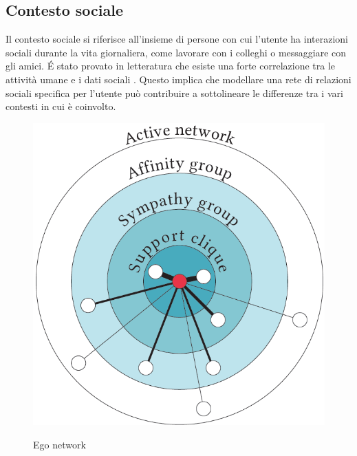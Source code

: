 \documentclass[12pt,italian]{report}
\begin{document}
\subsection{Contesto sociale} \label{subsec:social-context}
Il contesto sociale si riferisce all'insieme di persone con cui l'utente ha interazioni sociali durante la vita giornaliera, come lavorare con i colleghi o messaggiare con gli amici. \'E stato provato in letteratura che esiste una forte correlazione tra le attività umane e i dati sociali \cite{ego-net}. Questo implica che modellare una rete di relazioni sociali specifica per l'utente  può contribuire a sottolineare le differenze tra i vari contesti in cui è coinvolto.

\begin{figure}
  \centering
  \includegraphics[scale=0.50]{immagini/ego-network.png}
  \caption{Ego network}
  \label{fig:ego-network}
  \cite{ego-net}
\end{figure}
\end{document}
